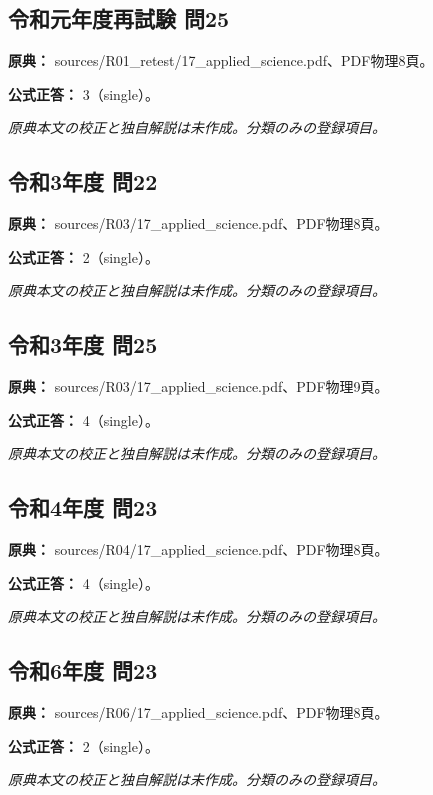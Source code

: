 \subsection{令和元年度再試験 問25}
\label{q:r01-ret-applied-25}

\noindent\textbf{原典：} sources/R01\_retest/17\_applied\_science.pdf、PDF物理8頁。

\textbf{公式正答：} 3（single）。

\par\textit{原典本文の校正と独自解説は未作成。分類のみの登録項目。}

\subsection{令和3年度 問22}
\label{q:r03-reg-applied-22}

\noindent\textbf{原典：} sources/R03/17\_applied\_science.pdf、PDF物理8頁。

\textbf{公式正答：} 2（single）。

\par\textit{原典本文の校正と独自解説は未作成。分類のみの登録項目。}

\subsection{令和3年度 問25}
\label{q:r03-reg-applied-25}

\noindent\textbf{原典：} sources/R03/17\_applied\_science.pdf、PDF物理9頁。

\textbf{公式正答：} 4（single）。

\par\textit{原典本文の校正と独自解説は未作成。分類のみの登録項目。}

\subsection{令和4年度 問23}
\label{q:r04-reg-applied-23}

\noindent\textbf{原典：} sources/R04/17\_applied\_science.pdf、PDF物理8頁。

\textbf{公式正答：} 4（single）。

\par\textit{原典本文の校正と独自解説は未作成。分類のみの登録項目。}

\subsection{令和6年度 問23}
\label{q:r06-reg-applied-23}

\noindent\textbf{原典：} sources/R06/17\_applied\_science.pdf、PDF物理8頁。

\textbf{公式正答：} 2（single）。

\par\textit{原典本文の校正と独自解説は未作成。分類のみの登録項目。}
